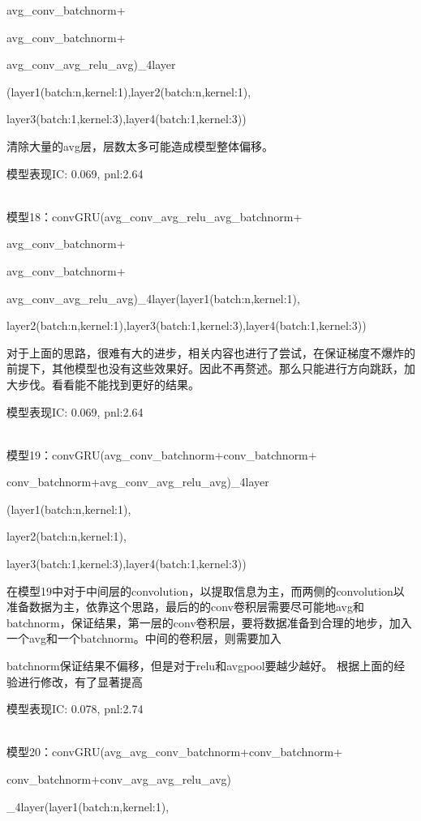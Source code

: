 \documentclass[11pt]{ctexart}
\begin{document}
avg\_conv\_batchnorm+

avg\_conv\_batchnorm+

avg\_conv\_avg\_relu\_avg)\_4layer

(layer1(batch:n,kernel:1),layer2(batch:n,kernel:1),

layer3(batch:1,kernel:3),layer4(batch:1,kernel:3))

清除大量的avg层，层数太多可能造成模型整体偏移。

模型表现{\kaishu \small IC: 0.069, pnl:2.64}


~\\
模型18：convGRU(avg\_conv\_avg\_relu\_avg\_batchnorm+

avg\_conv\_batchnorm+

avg\_conv\_batchnorm+

avg\_conv\_avg\_relu\_avg)\_4layer(layer1(batch:n,kernel:1), 

layer2(batch:n,kernel:1),layer3(batch:1,kernel:3),layer4(batch:1,kernel:3))

对于上面的思路，很难有大的进步，相关内容也进行了尝试，在保证梯度不爆炸的前提下，其他模型也没有这些效果好。因此不再赘述。那么只能进行方向跳跃，加大步伐。看看能不能找到更好的结果。

模型表现{\kaishu \small IC: 0.069, pnl:2.64}

~\\
模型19：convGRU(avg\_conv\_batchnorm+conv\_batchnorm+

conv\_batchnorm+avg\_conv\_avg\_relu\_avg)\_4layer

(layer1(batch:n,kernel:1), 

layer2(batch:n,kernel:1),

layer3(batch:1,kernel:3),layer4(batch:1,kernel:3))

在模型19中对于中间层的convolution，以提取信息为主，而两侧的convolution以准备数据为主，依靠这个思路，最后的的conv卷积层需要尽可能地avg和batchnorm，保证结果，第一层的conv卷积层，要将数据准备到合理的地步，加入一个avg和一个batchnorm。中间的卷积层，则需要加入 \par batchnorm保证结果不偏移，但是对于relu和avgpool要越少越好。
根据上面的经验进行修改，有了显著提高

模型表现{\kaishu \small IC: 0.078, pnl:2.74}

~\\
模型20：convGRU(avg\_avg\_conv\_batchnorm+conv\_batchnorm+

conv\_batchnorm+conv\_avg\_avg\_relu\_avg)

\_4layer(layer1(batch:n,kernel:1), 
\end{document}
